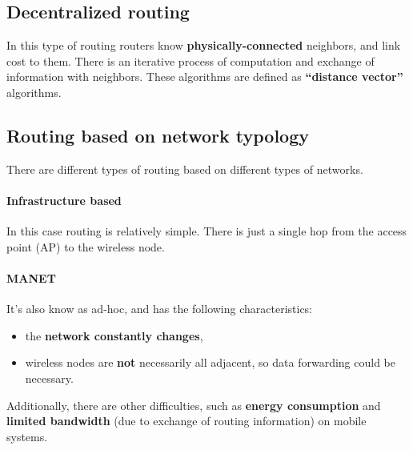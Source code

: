 \subsection{Decentralized routing}
In this type of routing routers know \textbf{physically-connected} neighbors,
and link cost to them.
There is an iterative process of computation and exchange of information with
neighbors.
These algorithms are defined as \textbf{``distance vector''} algorithms.

\subsection{Routing based on network typology}

There are different types of routing based on different types of networks.

\paragraph*{Infrastructure based} In this case routing is relatively simple.
There is just a single hop from the access point (AP) to the wireless node.

\paragraph*{MANET} It's also know as ad-hoc, and has the following
characteristics:
\begin{itemize}
\item the \textbf{network constantly changes},
\item wireless nodes are \textbf{not} necessarily all adjacent, so data forwarding
  could be necessary.
\end{itemize}
Additionally, there are other difficulties, such as \textbf{energy consumption}
and \textbf{limited bandwidth} (due to exchange of routing information)
on mobile systems.

